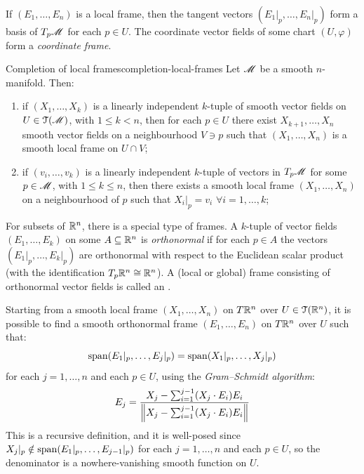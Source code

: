 If $ (E_1 , \dots , E_n) $ is a local frame, then the tangent vectors $ (E_1 \vert_p , \dots , E_n \vert_p) $ form a basis of $ T_p\mathscr{M} $ for each $ p \in U $. The coordinate vector fields of some chart $ (U,\varphi) $ form a \emph{coordinate frame}.

\begin{proposition}{Completion of local frames}{completion-local-frames}
  Let $ \mathscr{M} $ be a smooth $ n $-manifold. Then:
  \begin{enumerate}
    \item \label{item:locfr-1} if $ (X_1 , \dots , X_k) $ is a linearly independent $ k $-tuple of smooth vector fields on $ U \in \EuScript{T}(\mathscr{M}) $, with $ 1 \leq k < n $, then for each $ p \in U $ there exist $ X_{k+1} , \dots , X_n $ smooth vector fields on a neighbourhood $ V \ni p $ such that $ (X_1 , \dots , X_n) $ is a smooth local frame on $ U \cap V $;
    \item \label{item:locfr-2} if $ (v_i , \dots , v_k) $ is a linearly independent $ k $-tuple of vectors in $ T_p\mathscr{M} $ for some $ p \in \mathscr{M} $, with $ 1 \leq k \leq n $, then there exists a smooth local frame $ (X_1 , \dots , X_n) $ on a neighbourhood of $ p $ such that $ X_i \vert_p = v_i \,\,\forall i = 1, \dots, k $;
  \end{enumerate}
\end{proposition}

For subsets of $ \mathbb{R}^n $, there is a special type of frames. A $ k $-tuple of vector fields $ (E_1 , \dots , E_k) $ on some $ A \subseteq \mathbb{R}^n $ is \emph{orthonormal} if for each $ p \in A $ the vectors $ (E_1 \vert_p , \dots , E_k \vert_p) $ are orthonormal with respect to the Euclidean scalar product (with the identification $ T_p\mathbb{R}^n \cong \mathbb{R}^n $). A (local or global) frame consisting of orthonormal vector fields is called an .

Starting from a smooth local frame $ (X_1 , \dots , X_n) $ on $ T\mathbb{R}^n $ over $ U \in \EuScript{T}(\mathbb{R}^n) $, it is possible to find a smooth orthonormal frame $ (E_1 , \dots , E_n) $ on $ T\mathbb{R}^n $ over $ U $ such that:
\begin{equation*}
  \operatorname{span}(E_1 \vert_p , \dots , E_j \vert_p) = \operatorname{span}(X_1 \vert_p , \dots , X_j \vert_p)
\end{equation*}
for each $ j = 1 , \dots , n $ and each $ p \in U $, using the \emph{Gram--Schmidt algorithm}:
\begin{equation}
  E_j = \frac{X_j - \sum_{i = 1}^{j-1} (X_j \cdot E_i) E_i}{\left\lVert X_j - \sum_{i = 1}^{j-1} (X_j \cdot E_i) E_i\right\rVert}
\end{equation}
This is a recursive definition, and it is well-posed since $ X_j \vert_p \notin \operatorname{span}(E_1 \vert_p , \dots , E_{j-1} \vert_p) $ for each $ j = 1 , \dots , n $ and each $ p \in U $, so the denominator is a nowhere-vanishing smooth function on $ U $.

